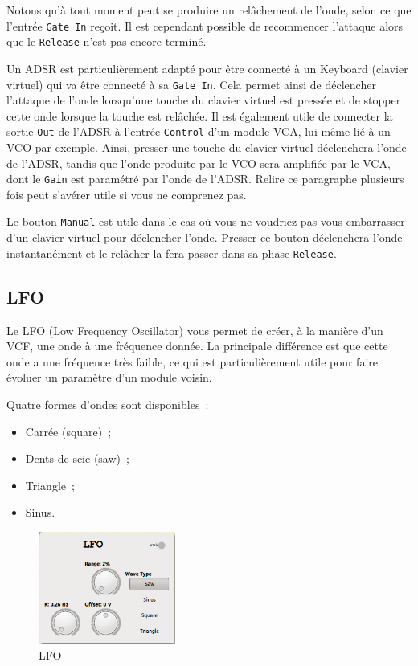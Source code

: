 \documentclass[a4paper,oneside,frenchb,10pt]{article}
\begin{document}
Notons qu'à tout moment peut se produire un relâchement de l'onde, selon
ce que l'entrée \verb!Gate In! reçoit. Il est cependant possible de
recommencer l'attaque alors que le \verb!Release! n'est pas encore
terminé.

Un ADSR est particulièrement adapté pour être connecté à un Keyboard
(clavier virtuel) qui va être connecté à sa \verb!Gate In!. Cela permet
ainsi de déclencher l'attaque de l'onde lorsqu'une touche du clavier
virtuel est pressée et de stopper cette onde lorsque la touche est
relâchée. Il est également utile de connecter la sortie \verb!Out! de
l'ADSR à l'entrée \verb!Control! d'un module VCA, lui même lié à un VCO
par exemple. Ainsi, presser une touche du clavier virtuel déclenchera
l'onde de l'ADSR, tandis que l'onde produite par le VCO sera amplifiée
par le VCA, dont le \verb!Gain! est paramétré par l'onde de l'ADSR.
Relire ce paragraphe plusieurs fois peut s'avérer utile si vous ne
comprenez pas.

Le bouton \verb!Manual! est utile dans le cas où vous ne voudriez pas
vous embarrasser d'un clavier virtuel pour déclencher l'onde. Presser ce
bouton déclenchera l'onde instantanément et le relâcher la fera passer
dans sa phase \verb!Release!.

\subsection{LFO}

\begin{multicols}{2}
Le LFO (Low Frequency Oscillator) vous permet de créer, à la manière
d'un VCF, une onde à une fréquence donnée. La principale différence est
que cette onde a une fréquence très faible, ce qui est particulièrement
utile pour faire évoluer un paramètre d'un module voisin.

Quatre formes d'ondes sont disponibles~:

\begin{itemize}
\item
  Carrée (square)~;
\item
  Dents de scie (saw)~;
\item
  Triangle~;
\item
  Sinus.
\end{itemize}

\begin{figure}[H]
\centering
\includegraphics[width=4.5cm]{../img/png/lfo.png}
\caption{LFO}
\end{figure}
\end{multicols}
\end{document}
